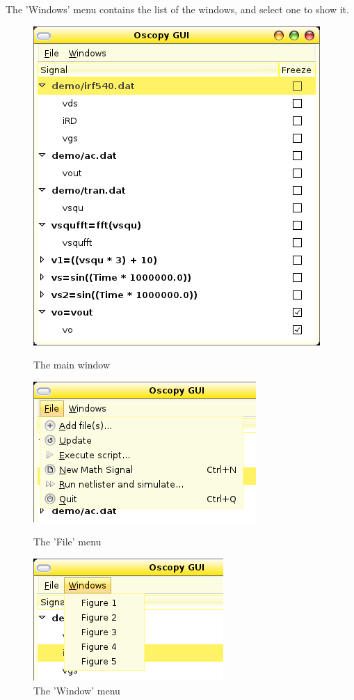 \documentclass[a4paper,11pt]{report}
\begin{document}
\noindent The 'Windows' menu contains the list of the windows, and select one to show it.


\begin{figure}[htbp]
  \centering
  \includegraphics[scale=.5]{../png/ioscopy-gui.png}
  \caption{The main window}
  \label{fig:mainwin}
  \begin{minipage}{.45\linewidth}
    \includegraphics[scale=.5]{../png/ioscopy-file.png}
    \caption{The 'File' menu}
    \label{fig:filemenu}
  \end{minipage}
  \begin{minipage}{.45\linewidth}
    \includegraphics[scale=.5]{../png/ioscopy-window.png}
    \caption{The 'Window' menu}
    \label{fig:windowmenu}    
  \end{minipage}


\end{figure}
\end{document}
